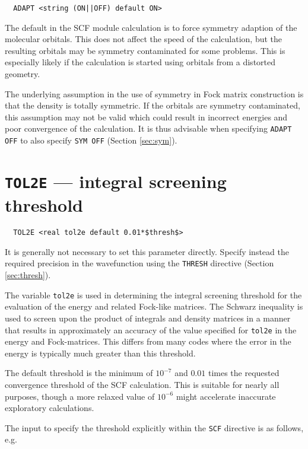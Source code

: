 \begin{verbatim}
  ADAPT <string (ON||OFF) default ON>
\end{verbatim}

The default in the SCF module calculation is to force symmetry
adaption of the molecular orbitals. This does not affect the speed of
the calculation, but the resulting orbitals may be symmetry
contaminated for some problems.  This is especially likely if the
calculation is started using orbitals from a distorted geometry.

The underlying assumption in the use of symmetry in Fock matrix
construction is that the density is totally symmetric.  If the orbitals
are symmetry contaminated, this assumption may not be valid which
could result in incorrect energies and poor convergence of the
calculation.  It is thus advisable when specifying \verb+ADAPT OFF+ to
also specify \verb+SYM OFF+ (Section \ref{sec:sym}).

\section{{\tt TOL2E} --- integral screening threshold}
\label{sec:tol2e}

\begin{verbatim}
  TOL2E <real tol2e default 0.01*$thresh$>
\end{verbatim}

It is generally not necessary to set this parameter directly.  Specify
instead the required precision in the wavefunction using the
\verb+THRESH+ directive (Section \ref{sec:thresh}).

The variable \verb+tol2e+ is used in determining the integral
screening threshold for the evaluation of the energy and related
Fock-like matrices.  The Schwarz inequality is used to screen upon the
product of integrals and density matrices in a manner that results in
approximately an accuracy of the value specified for \verb+tol2e+ in
the energy and Fock-matrices.  This differs from many codes where the
error in the energy is typically much greater than this threshold.

The default threshold is the minimum of $10^{-7}$ and $0.01$ times the
requested convergence threshold of the SCF calculation.  This is
suitable for nearly all purposes, though a more relaxed value of 
$10^{-6}$ might accelerate inaccurate exploratory calculations.

The input to specify the threshold explicitly within the
\verb+SCF+ directive is as follows, e.g.

